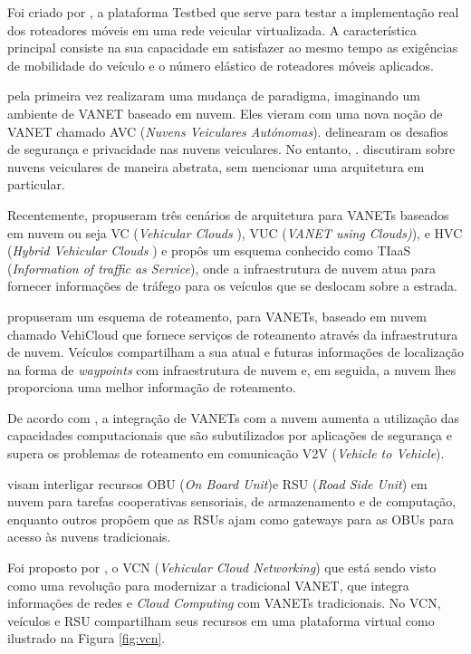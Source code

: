 \documentclass[
	12pt,				%
	oneside,			%
	a4paper,			%
	english,			%
	brazil				%
	]{abntex2ppgsi}
\begin{document}
Foi criado por , a plataforma Testbed que serve para testar a implementação real dos roteadores móveis em uma rede veicular virtualizada. A característica principal consiste na sua capacidade em satisfazer ao mesmo tempo as exigências de mobilidade do veículo e o número elástico de roteadores móveis aplicados.

 pela primeira vez realizaram uma mudança de paradigma, imaginando um ambiente de VANET baseado em nuvem. Eles vieram com uma nova noção de VANET chamado AVC (\textit{Nuvens Veiculares Autónomas}).   delinearam os desafios de segurança e privacidade nas nuvens veiculares. No entanto, . discutiram sobre nuvens veiculares de maneira abstrata, sem mencionar uma arquitetura em  particular. 

Recentemente,  propuseram três cenários de arquitetura para VANETs baseados em nuvem ou seja VC (\textit{Vehicular Clouds }), VUC (\textit{VANET using Clouds)}), e HVC (\textit{Hybrid Vehicular Clouds }) e propôs um esquema conhecido como TIaaS (\textit{Information of traffic as Service}), onde a infraestrutura de nuvem atua para fornecer informações de tráfego para os veículos que se deslocam sobre a estrada.

  propuseram um esquema de roteamento, para VANETs, baseado em nuvem chamado VehiCloud que fornece serviços de roteamento através da infraestrutura de nuvem. Veículos compartilham a sua atual e futuras informações de localização na forma de \textit{waypoints} com infraestrutura de nuvem e, em seguida, a nuvem lhes proporciona uma melhor informação de roteamento.

De acordo com , a integração de VANETs com a nuvem aumenta a utilização das capacidades computacionais que são subutilizados por aplicações de segurança e supera os problemas de roteamento em comunicação V2V (\textit{Vehicle to Vehicle}).

 visam interligar recursos OBU (\textit{On Board Unit})e RSU (\textit{Road Side Unit}) em nuvem para tarefas cooperativas sensoriais, de armazenamento e de computação, enquanto outros \cite{hussain2012rethinking} \cite{mershad2013finding} propôem que as RSUs ajam como gateways para as OBUs para acesso às nuvens tradicionais.

Foi proposto por , o VCN (\textit{Vehicular Cloud Networking}) que está sendo visto como uma revolução para modernizar a tradicional VANET, que integra informações de redes e \textit{Cloud Computing} com VANETs tradicionais. No VCN, veículos e  RSU compartilham seus recursos em uma plataforma virtual como ilustrado na Figura \ref{fig:vcn}.
\end{document}
